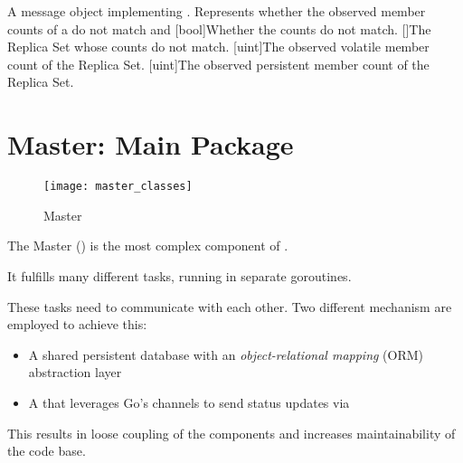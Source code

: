 {
A message object implementing .
  Represents whether the observed member counts of a  do not match  and 
}{
  [bool]{Whether the counts do not match.}
  []{The Replica Set whose counts do not match.}
  [uint]{The observed volatile member count of the Replica Set.}
  [uint]{The observed persistent member count of the Replica Set.}
}


\section{Master: Main Package}

\begin{figure}[H]
	\texttt{[image: master\_classes]}
	\caption{Master}
\end{figure}

The Master () is the most complex component of \mamid.

It fulfills many different tasks, running in separate goroutines.

These tasks need to communicate with each other. Two different mechanism are employed to achieve this:
\begin{itemize}
        \item A shared persistent database with an \emph{object-relational mapping} (ORM) abstraction layer
	\item A  that leverages Go's channels to send status updates via 
\end{itemize}
This results in loose coupling of the  components and increases maintainability of the code base.

